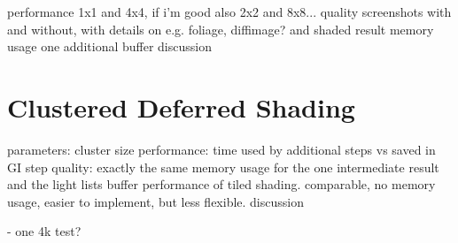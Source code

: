 \begin{outline}
\1 performance
\1 1x1 and 4x4, if i'm good also 2x2 and 8x8...
\1 quality
    \2 screenshots with and without, with details on e.g. foliage, diffimage? and shaded result
\1 memory usage
    \2 one additional buffer
\1 discussion

\end{outline}



\section{Clustered Deferred Shading}


\begin{outline}
\1 parameters: cluster size
\1 performance: time used by additional steps vs saved in GI step
\1 quality: exactly the same
\1 memory usage for the one intermediate result and the light lists buffer
\1 performance of tiled shading. comparable, no memory usage, easier to implement, but less flexible.
\1 discussion
\end{outline}




- one 4k test?

